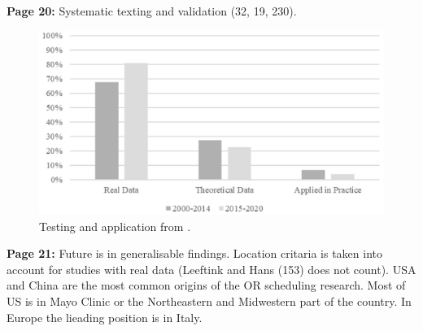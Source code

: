     \textbf{Page 20:}
    Systematic texting and validation (32, 19, 230).
    \begin{figure}[H]
        \centering
        \includegraphics[width=.8\textwidth]{figures/SR0002US22/fig3.png}
        \caption{Testing and application from \cite{x079}.}
        \label{fig3:SR0002US22}
    \end{figure}

    \textbf{Page 21:}
    Future is in generalisable findings. Location critaria is taken into account for studies with real data (Leeftink and Hans (153) does not count). USA and China are the most common origins of the OR scheduling research. Most of US is in Mayo Clinic or the Northeastern and Midwestern part of the country. In Europe the lieading position is in Italy.
    
